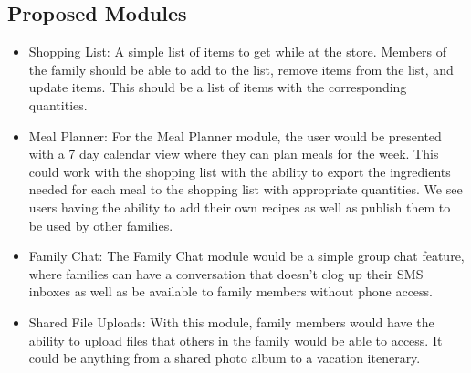 \documentclass[12pt]{article}
\begin{document}
\subsection{Proposed Modules}
\begin{itemize}
    \item Shopping List: A simple list of items to get while at the store. Members of the family should be able to add
            to the list, remove items from the list, and update items. This should be a list of items with the corresponding
            quantities.
    \item Meal Planner: For the Meal Planner module, the user would be presented with a 7 day calendar view where they can
            plan meals for the week. This could work with the shopping list with the ability to export the ingredients needed
            for each meal to the shopping list with appropriate quantities. We see users having the ability to add their own recipes
            as well as publish them to be used by other families.
    \item Family Chat: The Family Chat module would be a simple group chat feature, where families can have a conversation that 
            doesn't clog up their SMS inboxes as well as be available to family members without phone access.
    \item Shared File Uploads: With this module, family members would have the ability to upload files that others in the family
            would be able to access. It could be anything from a shared photo album to a vacation itenerary.
\end{itemize}
\end{document}
